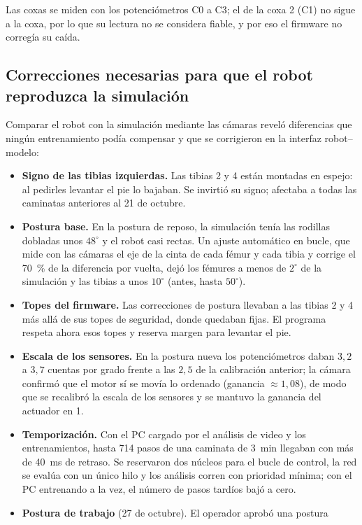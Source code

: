 Las coxas se miden con los potenciómetros C0 a C3; el de la coxa 2 (C1) no sigue a
la coxa, por lo que su lectura no se considera fiable, y por eso el firmware no
corregía su caída.

\subsection{Correcciones necesarias para que el robot reproduzca la simulación}

Comparar el robot con la simulación mediante las cámaras reveló diferencias que
ningún entrenamiento podía compensar y que se corrigieron en la interfaz
robot--modelo:
\begin{itemize}
    \item \textbf{Signo de las tibias izquierdas.} Las tibias 2 y 4 están
    montadas en espejo: al pedirles levantar el pie lo bajaban. Se invirtió su
    signo; afectaba a todas las caminatas anteriores al 21 de octubre.
    \item \textbf{Postura base.} En la postura de reposo, la simulación tenía las
    rodillas dobladas unos $48^\circ$ y el robot casi rectas. Un ajuste
    automático en bucle, que mide con las cámaras el eje de la cinta de cada
    fémur y cada tibia y corrige el 70~\% de la diferencia por vuelta, dejó los
    fémures a menos de $2^\circ$ de la simulación y las tibias a unos $10^\circ$
    (antes, hasta $50^\circ$).
    \item \textbf{Topes del firmware.} Las correcciones de postura llevaban a
    las tibias 2 y 4 más allá de sus topes de seguridad, donde quedaban fijas.
    El programa respeta ahora esos topes y reserva margen para levantar el pie.
    \item \textbf{Escala de los sensores.} En la postura nueva los
    potenciómetros daban $3{,}2$ a $3{,}7$ cuentas por grado frente a las
    $2{,}5$ de la calibración anterior; la cámara confirmó que el motor sí se
    movía lo ordenado (ganancia $\approx1{,}08$), de modo que se recalibró la
    escala de los sensores y se mantuvo la ganancia del actuador en 1.
    \item \textbf{Temporización.} Con el PC cargado por el análisis de video y
    los entrenamientos, hasta 714 pasos de una caminata de 3~min llegaban con más
    de 40~ms de retraso. Se reservaron dos núcleos para el bucle de control, la
    red se evalúa con un único hilo y los análisis corren con prioridad mínima;
    con el PC entrenando a la vez, el número de pasos tardíos bajó a cero.
    \item \textbf{Postura de trabajo} (27 de octubre). El operador aprobó una postura

\end{itemize}
